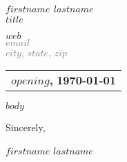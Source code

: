 \documentclass[$size$]{article}
\begin{document}
\begin{center}
    {\Large \textbf{$firstname$ $lastname$}}\\
    \textbf{$title$}
\end{center}

\bigskip

\noindent
\begin{flushright}
\textcolor{gray}
{
\href{$web$}{$web$} \\
$email$ \\
$city$, $state$, $zip$
}
\end{flushright}

\bigskip

\noindent
\begin{tabular}{@{}p{\textwidth}}
\textbf{$opening$,} \hfill \textbf{\today}
\end{tabular}

\bigskip

$body$

\bigskip

\noindent
Sincerely,

$firstname$ $lastname$

\bigskip

\noindent
\end{document}
